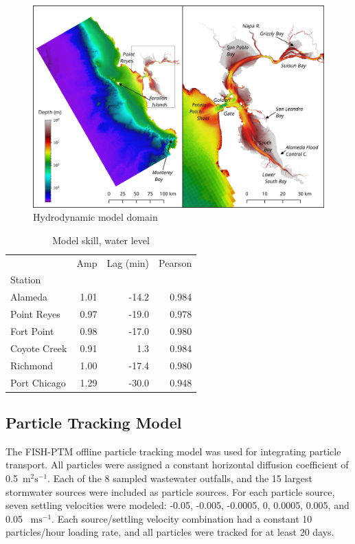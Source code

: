 \documentclass[draft]{jgr/agujournal2019}
\begin{document}
\begin{figure}
  \includegraphics{figures/twopanel-overview.png}
  \caption{Hydrodynamic model domain}
  \label{model_domain}
\end{figure}

\begin{table}
  \caption{Model skill, water level}
  \label{model_skill}
  \centering
  \begin{tabular}{lrrr}
    \hline
        {} &  Amp & Lag (min) & Pearson \\
        Station      &      &           &         \\
        \hline
        Alameda      & 1.01 &     -14.2 &   0.984 \\
        Point Reyes  & 0.97 &     -19.0 &   0.978 \\
        Fort Point   & 0.98 &     -17.0 &   0.980 \\
        Coyote Creek & 0.91 &       1.3 &   0.984 \\
        Richmond     & 1.00 &     -17.4 &   0.980 \\
        Port Chicago & 1.29 &     -30.0 &   0.948 \\
        \hline
  \end{tabular}
\end{table}


\subsection{Particle Tracking Model}

The FISH-PTM offline particle tracking model \cite{Ketefian2015}
was used for integrating particle transport. All particles were
assigned a constant horizontal diffusion coefficient of
0.5~$\textrm{m}^2 \textrm{s}^{-1}$.  Each of the 8 sampled wastewater outfalls,
and the 15 largest stormwater sources were included as particle sources.
For each particle source, seven settling velocities were modeled: -0.05,
-0.005, -0.0005, 0, 0.0005, 0.005, and 0.05 ~$\textrm{m} \textrm{s}^{-1}$.
Each source/settling velocity combination had a constant 10 particles/hour
loading rate, and all particles were tracked for at least 20 days.
\end{document}
